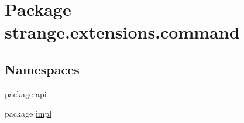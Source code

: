 \hypertarget{namespacestrange_1_1extensions_1_1command}{\section{Package strange.\-extensions.\-command}
\label{namespacestrange_1_1extensions_1_1command}
}
\subsection*{Namespaces}
\begin{DoxyCompactItemize}
\item 
package \hyperlink{namespacestrange_1_1extensions_1_1command_1_1api}{api}
\item 
package \hyperlink{namespacestrange_1_1extensions_1_1command_1_1impl}{impl}
\end{DoxyCompactItemize}
